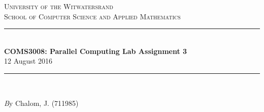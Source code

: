 \documentclass[11pt]{article}
\begin{document}
\begin{page}
\thispagestyle{empty}

\newcommand{\HRule}{\rule{\linewidth}{0.3mm}} %
\renewcommand\section{\@startsection{section}{1}{\z@}%
                                  {-3.5ex \@plus -1ex \@minus -.2ex}%
                                  {2.3ex \@plus.2ex}%
                                  {\normalfont\large\bfseries}}
\setlength{\parindent}{0pt}

\center %
 

\textsc{\LARGE University of the Witwatersrand}\\[1.5cm] %
\textsc{\Large School of Computer Science and Applied Mathematics}\\[0.5cm] %


\HRule \\[0.4cm]
{ \huge \bfseries COMS3008: Parallel Computing Lab Assignment 3}\\[0.4cm] %
  \large 12 August 2016
\HRule \\[1.5cm]
 
\begin{minipage}{1\textwidth}
  \Large \emph By Chalom, J. (711985)\\
\end{minipage}


\vfill %

\end{page}
\end{document}
